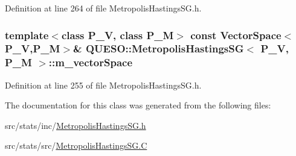 Definition at line 264 of file Metropolis\-Hastings\-S\-G.\-h.

\hypertarget{class_q_u_e_s_o_1_1_metropolis_hastings_s_g_a2ef17fbfc6a156f03bbfad044b5a75f5}{
\subsubsection[{m\-\_\-vector\-Space}]{\setlength{\rightskip}{0pt plus 5cm}template$<$class P\-\_\-\-V, class P\-\_\-\-M$>$ const {\bf Vector\-Space}$<$P\-\_\-\-V,P\-\_\-\-M$>$\& {\bf Q\-U\-E\-S\-O\-::\-Metropolis\-Hastings\-S\-G}$<$ P\-\_\-\-V, P\-\_\-\-M $>$\-::m\-\_\-vector\-Space\hspace{0.3cm}{\ttfamily [private]}}}\label{class_q_u_e_s_o_1_1_metropolis_hastings_s_g_a2ef17fbfc6a156f03bbfad044b5a75f5}


Definition at line 255 of file Metropolis\-Hastings\-S\-G.\-h.



The documentation for this class was generated from the following files\-:\begin{DoxyCompactItemize}
\item 
src/stats/inc/\hyperlink{_metropolis_hastings_s_g_8h}{Metropolis\-Hastings\-S\-G.\-h}\item 
src/stats/src/\hyperlink{_metropolis_hastings_s_g_8_c}{Metropolis\-Hastings\-S\-G.\-C}\end{DoxyCompactItemize}
